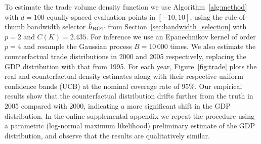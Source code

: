 To estimate the trade volume density function
we use Algorithm~\ref{alg:method}
with $d=100$ equally-spaced evaluation points in $[-10,10]$,
using the rule-of-thumb bandwidth selector $\hat h_{\operatorname{ROT}}$
from Section~\ref{sec:bandwidth_selection} with
$p=2$ and $C(K) = 2.435$.
For inference we use an
Epanechnikov kernel of order $p=4$ and
resample the Gaussian process
$B = 10\,000$ times.
We also estimate the counterfactual trade distributions
in 2000 and 2005 respectively,
replacing the GDP distribution with that from 1995.
For each year, Figure~\ref{fig:trade}
plots the real and counterfactual density estimates
along with their respective uniform confidence bands (UCB)
at the nominal coverage rate of $95\%$.
Our empirical results show that
the counterfactual distribution drifts further from the truth
in 2005 compared with 2000, indicating a more significant shift
in the GDP distribution.
In the online supplemental appendix we repeat the procedure
using a parametric (log-normal maximum likelihood) preliminary estimate
of the GDP distribution, and observe that the results
are qualitatively similar.

